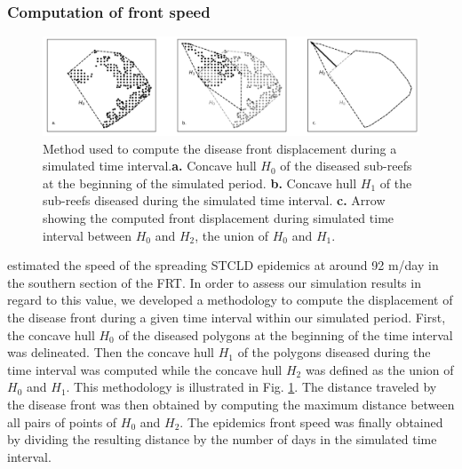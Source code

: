 \documentclass[utf8]{frontiersSCNS}
\begin{document}
\subsubsection{Computation of front speed}

\begin{figure}
    \centering
    \includegraphics[width=.99\linewidth]{figures/hull_example.png}
    \caption{Method used to compute the disease front displacement during a simulated time interval.\textbf{a.} Concave hull $H_0$ of the diseased sub-reefs at the beginning of the simulated period. \textbf{b.} Concave hull $H_1$ of the sub-reefs diseased during the simulated time interval. \textbf{c.} Arrow showing the computed front displacement during simulated time interval between $H_0$ and $H_2$, the union of $H_0$ and $H_1$.}
    \label{fig:hull}
\end{figure}

\cite{muller2020spatial} estimated the speed of the spreading STCLD epidemics at around 92 m/day in the southern section of the FRT. In order to assess our simulation results in regard to this value, we developed a methodology to compute the displacement of the disease front during a given time interval within our simulated period. First, the concave hull $H_0$ of the diseased polygons at the beginning of the time interval was delineated. Then the concave hull $H_1$ of the polygons diseased during the time interval was computed while the concave hull $H_2$ was defined as the union of $H_0$ and $H_1$. This methodology is illustrated in Fig. \ref{fig:hull}. The distance traveled by the disease front was then obtained by computing the maximum distance between all pairs of points of $H_0$ and $H_2$. The epidemics front speed was finally obtained by dividing the resulting distance by the number of days in the simulated time interval.
\end{document}
